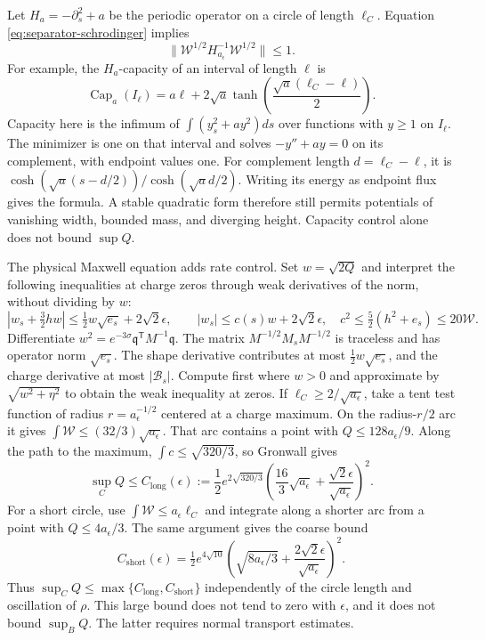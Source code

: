 \documentclass[a4paper,11pt]{article}
\numberwithin{equation}{section}
\theoremstyle{definition}
\begin{document}
Let $H_a=-\partial_s^2+a$ be the periodic operator on a circle of length $\ell_C$.
Equation \eqref{eq:separator-schrodinger} implies
\[
 \|\mathcal W^{1/2}H_{a_\epsilon}^{-1}\mathcal W^{1/2}\|\le1.
\]
For example, the $H_a$-capacity of an interval of length $\ell$ is
\[
 \operatorname{Cap}_a(I_\ell)
 =a\ell+2\sqrt a\tanh\!\left(\frac{\sqrt a(\ell_C-\ell)}2\right).
\]
Capacity here is the infimum of $\int(y_s^2+ay^2)ds$ over functions with $y\ge1$ on $I_\ell$.
The minimizer is one on that interval and solves $-y''+ay=0$ on its complement, with endpoint values one.
For complement length $d=\ell_C-\ell$, it is
$\cosh(\sqrt a(s-d/2))/\cosh(\sqrt a d/2)$.
Writing its energy as endpoint flux gives the formula.
A stable quadratic form therefore still permits potentials of vanishing width, bounded mass, and diverging height.
Capacity control alone does not bound $\sup Q$.

The physical Maxwell equation adds rate control.
Set $w=\sqrt{2Q}$ and interpret the following inequalities at charge zeros through weak derivatives of the norm, without dividing by $w$:
\[
 |w_s+\tfrac32hw|\le\tfrac12w\sqrt{e_s}+2\sqrt2\epsilon,
 \qquad
 |w_s|\le c(s)w+2\sqrt2\epsilon,
 \quad c^2\le\tfrac52(h^2+e_s)\le20\mathcal W.
\]
Differentiate $w^2=e^{-3\sigma}\mathfrak q^{\mathsf T}M^{-1}\mathfrak q$.
The matrix $M^{-1/2}M_sM^{-1/2}$ is traceless and has operator norm $\sqrt{e_s}$.
The shape derivative contributes at most $\frac12w\sqrt{e_s}$, and the charge derivative at most $|\mathscr B_s|$.
Compute first where $w>0$ and approximate by $\sqrt{w^2+\eta^2}$ to obtain the weak inequality at zeros.
If $\ell_C\ge2/\sqrt{a_\epsilon}$, take a tent test function of radius $r=a_\epsilon^{-1/2}$ centered at a charge maximum.
On the radius-$r/2$ arc it gives $\int\mathcal W\le(32/3)\sqrt{a_\epsilon}$.
That arc contains a point with $Q\le128a_\epsilon/9$.
Along the path to the maximum, $\int c\le\sqrt{320/3}$, so Gronwall gives
\begin{equation}\label{eq:separator-Q-bound}
 \sup_CQ\le C_{\mathrm{long}}(\epsilon):=
 \frac12e^{2\sqrt{320/3}}
 \left(\frac{16}{3}\sqrt{a_\epsilon}
       +\frac{\sqrt2\epsilon}{\sqrt{a_\epsilon}}\right)^2.
\end{equation}
For a short circle, use $\int\mathcal W\le a_\epsilon\ell_C$ and integrate along a shorter arc from a point with $Q\le4a_\epsilon/3$.
The same argument gives the coarse bound
\[
 C_{\mathrm{short}}(\epsilon)=\tfrac12e^{4\sqrt{10}}
 \left(\sqrt{8a_\epsilon/3}
       +\frac{2\sqrt2\epsilon}{\sqrt{a_\epsilon}}\right)^2.
\]
Thus $\sup_CQ\le\max\{C_{\mathrm{long}},C_{\mathrm{short}}\}$ independently of the circle length and oscillation of $\rho$.
This large bound does not tend to zero with $\epsilon$, and it does not bound $\sup_BQ$.
The latter requires normal transport estimates.
\end{document}

